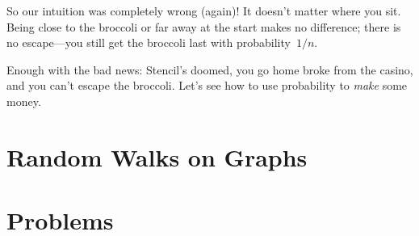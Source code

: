 So our intuition was completely wrong (again)!  It doesn't matter
where you sit.  Being close to the broccoli or far away at the start
makes no difference; there is no escape---you still get the broccoli
last with probability~$1/n$.

Enough with the bad news: Stencil's doomed, you go home broke from the
casino, and you can't escape the broccoli.  Let's see how to use
probability to \emph{make} some money.

\section{Random Walks on Graphs}

\section{Problems}

\endinput
